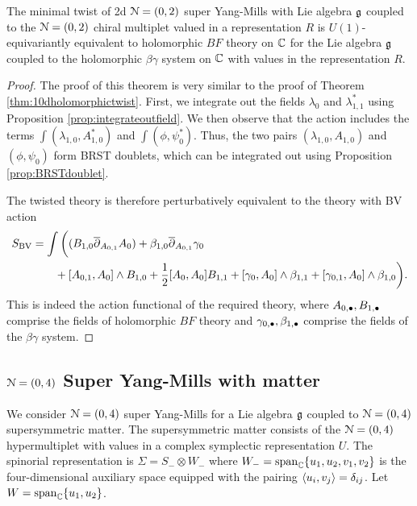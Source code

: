 \documentclass[10pt, oneside]{article}
\begin{document}
\begin{theorem} \label{2d(0,2)}
The minimal twist of 2d $\mathcal N=(0,2)$ super Yang-Mills with Lie algebra $\mathfrak g$ coupled to the $\mathcal N=(0,2)$ chiral multiplet valued in a representation $R$ is $U(1)$-equivariantly equivalent to holomorphic $BF$ theory on $\mathbb C$ for the Lie algebra $\mathfrak g$ coupled to the holomorphic $\beta\gamma$ system on $\mathbb C$ with values in the representation $R$. 
\end{theorem}
\begin{proof}
The proof of this theorem is very similar to the proof of Theorem \ref{thm:10dholomorphictwist}.  
First, we integrate out the fields $\lambda_{0}$ and $\lambda_{1,1}^*$ using Proposition \ref{prop:integrateoutfield}.  
We then observe that the action includes the terms $\int  (\lambda_{1,0} , A_{1,0}^*)$ and  $\int (\phi, \psi_0^*)$.  
Thus, the two pairs $(\lambda_{1,0}, A_{1,0})$ and $(\phi, \psi_0)$ form BRST doublets, 
which can be integrated out using Proposition \ref{prop:BRSTdoublet}.  

The twisted theory is therefore perturbatively equivalent to the theory with BV action 
\begin{align*}
 S_{\mathrm{BV}} &= \int \bigg( (B_{1,0} \overline{\partial}_{A_{0,1}} A_{0})  + \beta_{1,0} \overline{\partial}_{A_{0,1}} \gamma_{0} \\ 
  &\qquad  + [A_{0,1}, A_0]\wedge B_{1,0} + \frac{1}{2}[A_0, A_0]B_{1,1} +  [\gamma_0, A_0]\wedge \beta_{1,1} + [\gamma_{0,1}, A_0]\wedge \beta_{1,0}  \bigg).
\end{align*}
This is indeed the action functional of the required theory, where $A_{0,\bullet}, B_{1,\bullet}$ comprise the fields of holomorphic $BF$ theory and $\gamma_{0,\bullet}, \beta_{1,\bullet}$ comprise the fields of the $\beta\gamma$ system.
\end{proof}

\subsection{\texorpdfstring{$\mathcal N=(0,4)$}{N=(0,4)} Super Yang-Mills with matter}

We consider $\mathcal N=(0,4)$ super Yang-Mills for a Lie algebra $\mathfrak g$ coupled to $\mathcal N=(0,4)$ supersymmetric matter. 
The supersymmetric matter consists of the $\mathcal N = (0,4)$ hypermultiplet with values in a complex symplectic representation $U$. 
The spinorial representation is $\Sigma = S_- \otimes W_-$ where $W_- = {\rm span}_{\mathbb C} \{u_1,u_2, v_1,v_2\}$ is the four-dimensional auxiliary space equipped with the pairing $\langle u_i, v_j\rangle = \delta_{ij}$. 
Let $W = {\rm span}_{\mathbb C} \{u_1,u_2\}$. 
\end{document}
